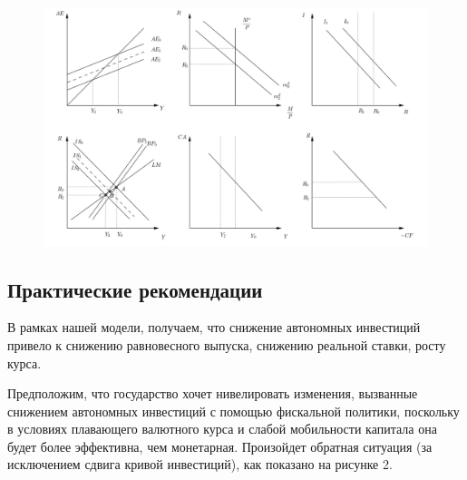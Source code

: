 \documentclass[12pt,a4paper, oneside]{extreport}
\begin{document}
\begin{figure}
	\centering
	\includegraphics[width=1\linewidth]{screenshot002}
	\caption{}
	\label{fig:screenshot002}
\end{figure}




\subsection*{Практические рекомендации}


В рамках нашей модели, получаем, что снижение автономных инвестиций привело к снижению равновесного выпуска, снижению реальной ставки, росту курса. 


Предположим, что государство  хочет  нивелировать изменения, вызванные снижением автономных инвестиций  с помощью  фискальной  политики, поскольку  в условиях плавающего валютного курса и слабой мобильности капитала она будет более   эффективна, чем монетарная. 
Произойдет обратная ситуация (за исключением сдвига кривой инвестиций), как показано на рисунке 2. 
\end{document}
